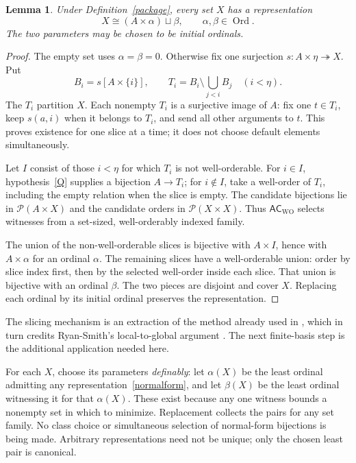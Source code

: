 \documentclass[11pt,a4paper]{article}
\newcommand{\ACWO}{\mathsf{AC}_{\mathrm{WO}}}
\newcommand{\Ord}{\operatorname{Ord}}
\newcommand{\calP}{\mathcal P}
\newcommand{\onto}{\twoheadrightarrow}
\newtheorem{lemma}[theorem]{Lemma}
\theoremstyle{definition}
\theoremstyle{remark}
\begin{document}
\begin{lemma}\label{NF}
Under Definition~\ref{package}, every set $X$ has a representation
\begin{equation}\label{normalform}
 X\cong(A\times\alpha)\sqcup\beta,
 \qquad \alpha,\beta\in\Ord.
\end{equation}
The two parameters may be chosen to be initial ordinals.
\end{lemma}
\begin{proof}
The empty set uses $\alpha=\beta=0$. Otherwise fix one surjection $s:A\times\eta\onto X$. Put
\[
 B_i=s[A\times\{i\}],\qquad
 T_i=B_i\setminus\bigcup_{j<i}B_j\quad(i<\eta).
\]
The $T_i$ partition $X$. Each nonempty $T_i$ is a surjective image of $A$: fix one $t\in T_i$, keep $s(a,i)$ when it belongs to $T_i$, and send all other arguments to $t$. This proves existence for one slice at a time; it does not choose default elements simultaneously.

Let $I$ consist of those $i<\eta$ for which $T_i$ is not well-orderable. For $i\in I$, hypothesis~\ref{Q} supplies a bijection $A\to T_i$; for $i\notin I$, take a well-order of $T_i$, including the empty relation when the slice is empty. The candidate bijections lie in $\calP(A\times X)$ and the candidate orders in $\calP(X\times X)$. Thus $\ACWO$ selects witnesses from a set-sized, well-orderably indexed family.

The union of the non-well-orderable slices is bijective with $A\times I$, hence with $A\times\alpha$ for an ordinal $\alpha$. The remaining slices have a well-orderable union: order by slice index first, then by the selected well-order inside each slice. That union is bijective with an ordinal $\beta$. The two pieces are disjoint and cover $X$. Replacing each ordinal by its initial ordinal preserves the representation.
\end{proof}

The slicing mechanism is an extraction of the method already used in \cite[Lemma 7.1]{OpenAI}, which in turn credits Ryan-Smith's local-to-global argument \cite{RyanSmith}. The next finite-basis step is the additional application needed here.

For each $X$, choose its parameters \emph{definably}: let $\alpha(X)$ be the least ordinal admitting any representation~\eqref{normalform}, and let $\beta(X)$ be the least ordinal witnessing it for that $\alpha(X)$. These exist because any one witness bounds a nonempty set in which to minimize. Replacement collects the pairs for any set family. No class choice or simultaneous selection of normal-form bijections is being made. Arbitrary representations need not be unique; only the chosen least pair is canonical.
\end{document}
